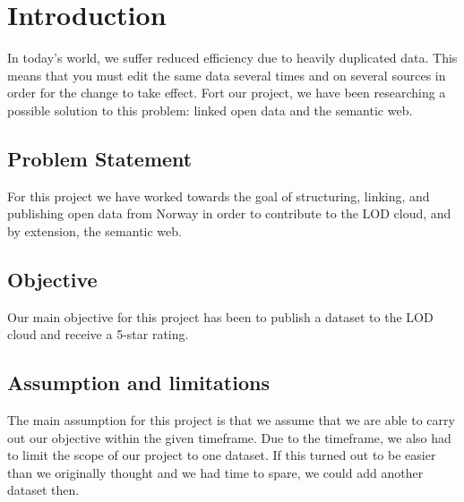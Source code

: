 \chapter{Introduction}
In today’s world, we suffer reduced efficiency due to heavily duplicated data. This means that you must edit the same data several times and on several sources in order for the change to take effect. Fort our project, we have been researching a possible solution to this problem: linked open data and the semantic web.

\section{Problem Statement}
For this project we have worked towards the goal of structuring, linking, and publishing open data from Norway in order to contribute to the LOD cloud, and by extension, the semantic web.

\section{Objective}
Our main objective for this project has been to publish a dataset to the LOD cloud and receive a 5-star rating.

\section{Assumption and limitations}
The main assumption for this project is that we assume that we are able to carry out our objective within the given timeframe. Due to the timeframe, we also had to limit the scope of our project to one dataset. If this turned out to be easier than we originally thought and we had time to spare, we could add another dataset then.
